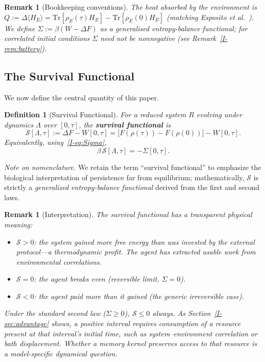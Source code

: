 \documentclass[12pt,a4paper,openany]{book}
\newtheorem{definition}[theorem]{Definition}
\newtheorem{remark}[theorem]{Remark}
\begin{document}
\begin{remark}[Bookkeeping conventions]
\label{I-rem:bookkeeping}
The heat absorbed by the environment is
$Q := \Delta\langle H_E \rangle
= \mathrm{Tr}[\rho_E(\tau) H_E]
  - \mathrm{Tr}[\rho_E(0) H_E]$
(matching
Esposito \emph{et al.}~\cite{EspositoLindenbergVandenBroeck2010}).
We define $\Sigma := \beta(W - \Delta F)$ as a
\emph{generalised entropy-balance functional};
for correlated initial conditions $\Sigma$ need not be
nonnegative
(see Remark~\ref{I-rem:battery}).
\end{remark}

\subsection{The Survival Functional}
\label{I-subsec:survival}

We now define the central quantity of this paper.

\begin{definition}[Survival Functional]
\label{I-def:survival}
For a reduced system $R$ evolving under dynamics $\Lambda$
over $[0,\tau]$, the \textbf{survival functional} is
\begin{equation}
\label{I-eq:survival}
\mathcal{S}[\Lambda, \tau]
:= \Delta F - W[0,\tau]
= \bigl[F(\rho(\tau)) - F(\rho(0))\bigr] - W[0,\tau].
\end{equation}
Equivalently, using~\eqref{I-eq:Sigma},
\begin{equation}
\label{I-eq:survival_Sigma}
\beta\,\mathcal{S}[\Lambda,\tau] = -\Sigma[0,\tau].
\end{equation}
\end{definition}

\noindent\textit{Note on nomenclature.}
We retain the term ``survival functional'' to emphasize
the biological interpretation of persistence far from
equilibrium; mathematically, $\mathcal{S}$ is strictly a
\emph{generalized entropy-balance functional} derived from
the first and second laws.

\begin{remark}[Interpretation]
\label{I-rem:survival_interp}
The survival functional has a transparent physical meaning:
\begin{itemize}
\item $\mathcal{S} > 0$: the system gained more free energy than
  was invested by the external protocol---a \emph{thermodynamic
  profit}. The agent has extracted usable work from environmental
  correlations.
\item $\mathcal{S} = 0$: the agent breaks even (reversible limit,
  $\Sigma = 0$).
\item $\mathcal{S} < 0$: the agent paid more than it gained
  (the generic irreversible case).
\end{itemize}
Under the standard second law ($\Sigma \geq 0$),
$\mathcal{S} \leq 0$ always.
As Section~\ref{I-sec:advantage} shows, a positive interval requires
consumption of a resource present at that interval's initial time,
such as system--environment correlation or bath displacement.
Whether a memory kernel preserves access to that resource is a
model-specific dynamical question.
\end{remark}
\end{document}
